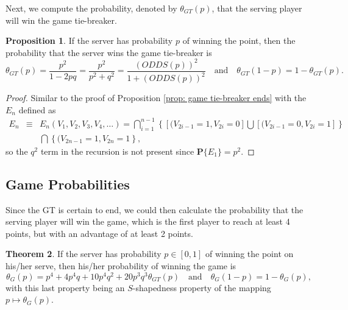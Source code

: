 \documentclass[11pt]{article}
\theoremstyle{plain}
\theoremstyle{definition}
\newtheorem{theorem}{Theorem}[section]
\newtheorem{proposition}[theorem]{Proposition}
\renewcommand{\Pr}{\mathbf{P}}
\begin{document}
Next, we compute the probability, denoted by $\theta_{GT}(p)$, that the serving player will win the game tie-breaker.

\begin{proposition}
\label{prop: game probability}
    If the server has probability $p$ of winning the point, then the probability that the server wins the game tie-breaker is
    $$\theta_{GT}(p) = \frac{p^2}{1-2pq} = \frac{p^2}{p^2 + q^2} = \frac{(ODDS(p))^2}{1 + (ODDS(p))^2} \quad
    \mbox{and} \quad
    \theta_{GT}(1-p) = 1 - \theta_{GT}(p).$$
\end{proposition}

\begin{proof}
    Similar to the proof of Proposition \ref{prop: game tie-breaker ends} with the $E_n$ defined as
    \begin{eqnarray*}
    E_n & \equiv & E_n(V_1, V_2, V_3, V_4, \ldots) 
    =  \bigcap_{i=1}^{n-1} \left\{[ (V_{2i-1}  = 1,V_{2i} = 0 ]  \bigcup [ (V_{2i-1} = 0, V_{2i} = 1 ] \right\}  \\ &&  
    \bigcap \left\{ (V_{2n-1} = 1, V_{2n} = 1 \right\},
    \end{eqnarray*}
   so the $q^2$ term in the recursion is not present since $\Pr\{E_1\} = p^2.$
\end{proof}

\subsection{Game Probabilities}

Since the GT is certain to end, we could then calculate the probability that the serving player will win the game, which is the first player to reach at least 4 points, but with an advantage of at least 2 points.

\begin{theorem} \label{thm: prob wins game}
If the server has probability $p \in [0,1]$ of winning the point on his/her serve, then his/her probability of winning the game is
%
$$\theta_G(p) = p^4 + 4p^4 q + 10p^4 q^2 + 20p^3 q^3 \theta_{GT}(p) \quad
%
\mbox{and} \quad
%
\theta_G(1-p) = 1 - \theta_G(p),$$
%
with this last property being an $S$-shapedness property of the mapping $p \mapsto \theta_G(p)$.
%
\end{theorem}
\end{document}
